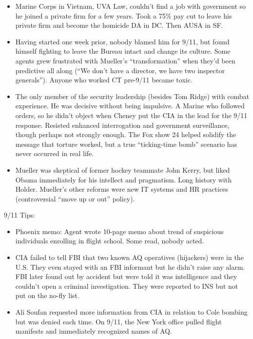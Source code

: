 \documentclass[
]{article}
\begin{document}
\begin{itemize}
\item
  Marine Corps in Vietnam, UVA Law, couldn't find a job with government
  so he joined a private firm for a few years. Took a 75\% pay cut to
  leave his private firm and become the homicide DA in DC. Then AUSA in
  SF.
\item
  Having started one week prior, nobody blamed him for 9/11, but found
  himself fighting to leave the Bureau intact and change its culture.
  Some agents grew frustrated with Mueller's ``transformation'' when
  they'd been predictive all along (``We don't have a director, we have
  two inspector generals''). Anyone who worked CT pre-9/11 became toxic.
\item
  The only member of the security leadership (besides Tom Ridge) with
  combat experience. He was decisive without being impulsive. A Marine
  who followed orders, so he didn't object when Cheney put the CIA in
  the lead for the 9/11 response. Resisted enhanced interrogation and
  government surveillance, though perhaps not strongly enough. The Fox
  show 24 helped solidify the message that torture worked, but a true
  ``ticking-time bomb'' scenario has never occurred in real life.
\item
  Mueller was skeptical of former hockey teammate John Kerry, but liked
  Obama immediately for his intellect and pragmatism. Long history with
  Holder. Mueller's other reforms were new IT systems and HR practices
  (controversial ``move up or out'' policy).
\end{itemize}

9/11 Tips:

\begin{itemize}
\item
  Phoenix memo: Agent wrote 10-page memo about trend of suspicious
  individuals enrolling in flight school. Some read, nobody acted.
\item
  CIA failed to tell FBI that two known AQ operatives (hijackers) were
  in the U.S. They even stayed with an FBI informant but he didn't raise
  any alarm. FBI later found out by accident but were told it was
  intelligence and they couldn't open a criminal investigation. They
  were reported to INS but not put on the no-fly list.
\item
  Ali Soufan requested more information from CIA in relation to Cole
  bombing but was denied each time. On 9/11, the New York office pulled
  flight manifests and immediately recognized names of AQ.
\end{itemize}
\end{document}
